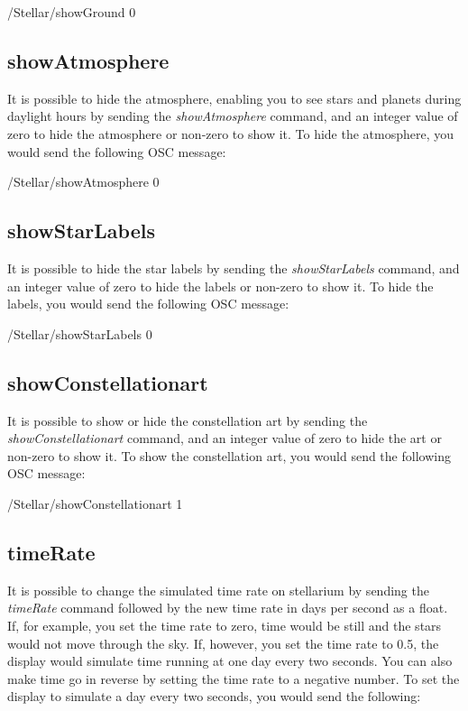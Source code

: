   \begin{syntax}	
 	\medskip
 	/Stellar/showGround 0
 	\medskip
 \end{syntax}

 \subsection{showAtmosphere}
It is possible to hide the atmosphere, enabling you to see stars and planets during daylight hours by sending the \textit{showAtmosphere} command, and an integer value of zero to hide the atmosphere or non-zero to show it. To hide the atmosphere, you would send the following OSC message:

\begin{syntax}	
	\medskip
	/Stellar/showAtmosphere 0
	\medskip
\end{syntax}

 \subsection{showStarLabels}
It is possible to hide the star labels  by sending the \textit{showStarLabels} command, and an integer value of zero to hide the labels or non-zero to show it. To hide the labels, you would send the following OSC message:

\begin{syntax}	
	\medskip
	/Stellar/showStarLabels 0
	\medskip
\end{syntax}

 \subsection{showConstellationart}
It is possible to show or hide the constellation art by sending the \textit{showConstellationart} command, and an integer value of zero to hide the art or non-zero to show it. To show the constellation art, you would send the following OSC message:

\begin{syntax}	
	\medskip
	/Stellar/showConstellationart 1
	\medskip
\end{syntax}

\subsection{timeRate}
It is possible to change the simulated time rate on stellarium by sending the \textit{timeRate} command followed by the new time rate in days per second as a float. If, for example, you set the time rate to zero, time would be still and the stars would not move through the sky. If, however, you set the time rate to 0.5, the display would simulate time running at one day every two seconds. You can also make time go in reverse by setting the time rate to a negative number. To set the display to simulate a day every two seconds, you would send the following:

